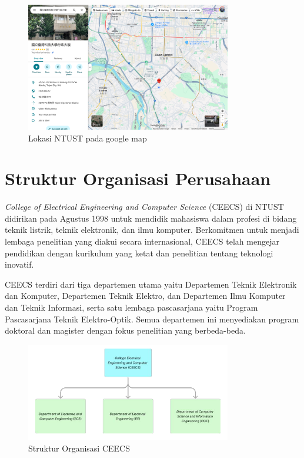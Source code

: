 \begin{figure}[H]
    \centering
    \includegraphics[width=0.8\textwidth]{assets/pics/lokasintust.png}
    \caption{Lokasi NTUST pada google map}
    \label{fig:loc}
\end{figure}

\section{Struktur Organisasi Perusahaan}

\textit{College of Electrical Engineering and Computer Science} (CEECS) di NTUST didirikan pada Agustus 1998 untuk mendidik mahasiswa dalam profesi di bidang teknik listrik, teknik elektronik, dan ilmu komputer. Berkomitmen untuk menjadi lembaga penelitian yang diakui secara internasional, CEECS telah mengejar pendidikan dengan kurikulum yang ketat dan penelitian tentang teknologi inovatif. \cite{ceecs_history}

CEECS terdiri dari tiga departemen utama yaitu Departemen Teknik Elektronik dan Komputer, Departemen Teknik Elektro, dan Departemen Ilmu Komputer dan Teknik Informasi, serta satu lembaga pascasarjana yaitu Program Pascasarjana Teknik Elektro-Optik. Semua departemen ini menyediakan program doktoral dan magister dengan fokus penelitian yang berbeda-beda.

\begin{figure}[H]
    \centering
    \includegraphics[width=0.8\textwidth]{assets/pics/ceecs.png}
    \caption{Struktur Organisasi CEECS}
    \label{fig:struktur_ceecs}
\end{figure}

